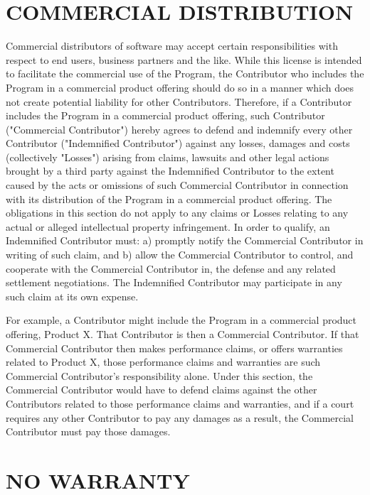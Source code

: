 \section{COMMERCIAL DISTRIBUTION}

Commercial distributors of software may accept certain responsibilities with  respect to end users, business partners and the like. While this license is  intended to facilitate the commercial use of the Program, the Contributor who  includes the Program in a commercial product offering should do so in a manner  which does not create potential liability for other Contributors. Therefore, if  a Contributor includes the Program in a commercial product offering, such  Contributor ("Commercial Contributor") hereby agrees to defend and indemnify  every other Contributor ("Indemnified Contributor") against any losses, damages  and costs (collectively "Losses") arising from claims, lawsuits and other legal actions brought by a third party against the Indemnified Contributor to the  extent caused by the acts or omissions of such Commercial Contributor in  connection with its distribution of the Program in a commercial product  offering. The obligations in this section do not apply to any claims or Losses  relating to any actual or alleged intellectual property infringement. In order  to qualify, an Indemnified Contributor must: a) promptly notify the Commercial  Contributor in writing of such claim, and b) allow the Commercial Contributor  to control, and cooperate with the Commercial Contributor in, the defense and  any related settlement negotiations. The Indemnified Contributor may  participate in any such claim at its own expense.


For example, a Contributor might include the Program in a commercial product  offering, Product X. That Contributor is then a Commercial Contributor. If that  Commercial Contributor then makes performance claims, or offers warranties  related to Product X, those performance claims and warranties are such  Commercial Contributor's responsibility alone. Under this section, the  Commercial Contributor would have to defend claims against the other  Contributors related to those performance claims and warranties, and if a court  requires any other Contributor to pay any damages as a result, the Commercial  Contributor must pay those damages.

\section{NO WARRANTY}



